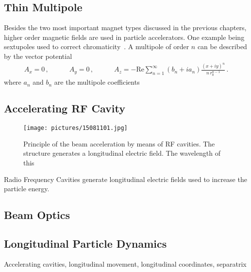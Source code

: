 \subsection{Thin Multipole}
Besides the two most important magnet types discussed in the previous chapters, higher order magnetic fields are used in particle accelerators. One example being sextupoles used to correct chromaticity~\cite{}. A multipole of order $n$ can be described by the vector potential
\begin{align}
A_x = 0 \, , \quad \quad \quad A_y = 0 \, , \quad \quad \quad A_z = - \text{Re} \sum_{n=1}^{\infty} (b_n + i a_n) \frac{(x+i y)^n}{n \, r_0^{n-1}} \, .
\end{align} 
where $a_n$ and $b_n$ are the multipole coefficients

\newpage

\subsection{Accelerating RF Cavity}
  \begin{figure}[t]
  \centering
  \texttt{[image: pictures/15081101.jpg]}
  \caption{Principle of the beam acceleration by means of RF cavities. The structure generates a longitudinal electric field. The wavelength of this }  
  \label{pic:15081101}
  \end{figure}
Radio Frequency Cavities generate longitudinal electric fields used to increase the particle energy.	





\subsection{Beam Optics}


\subsection{Longitudinal Particle Dynamics}

Accelerating cavities, longitudinal movement, longitudinal coordinates, separatrix



